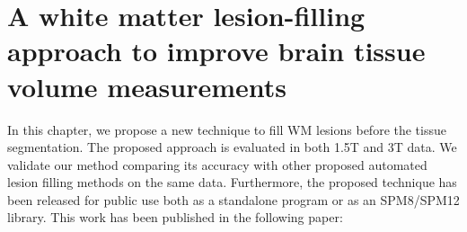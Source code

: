 
\chapter{A white matter lesion-filling approach to improve brain tissue volume measurements}

\label{chapter:chapter_4}

In this chapter, we propose a new technique to fill WM lesions before the tissue segmentation. The proposed approach is evaluated in both 1.5T and 3T data. We validate our method comparing its accuracy with other proposed automated lesion filling methods on the same data. Furthermore, the proposed technique has been released for public use both as a standalone program or as an SPM8/SPM12 library.  
This work has been published in the following paper:

\vspace{2cm}

\noindent{}




